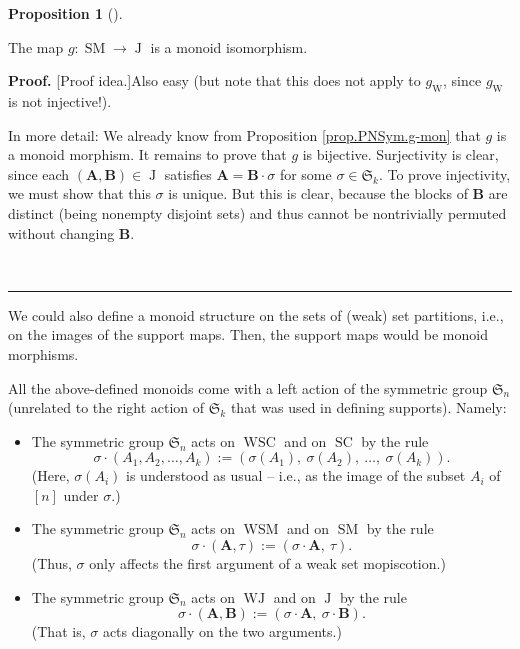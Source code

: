 \documentclass[numbers=enddot,12pt,final,onecolumn,notitlepage]{scrartcl}%
\theoremstyle{definition}
\newtheorem{prop}[theo]{Proposition}
\newenvironment{proposition}[1][]
{\begin{prop}[#1]\begin{leftbar}}
{\end{leftbar}\end{prop}}
\newenvironment{fineprint}{\begin{small}}{\end{small}}
\newenvironment{proof}[1][Proof]{\noindent\textbf{#1.} }{\ \rule{0.5em}{0.5em}}
\begin{document}
\begin{proposition}
\label{prop.PNSym.g-inj}The map $g:\operatorname*{SM}\rightarrow
\operatorname*{J}$ is a monoid isomorphism.
\end{proposition}

\begin{proof}
[Proof idea.]Also easy (but note that this does not apply to
$g_{\operatorname*{W}}$, since $g_{\operatorname*{W}}$ is not injective!).

\begin{fineprint}
In more detail: We already know from Proposition \ref{prop.PNSym.g-mon} that
$g$ is a monoid morphism. It remains to prove that $g$ is bijective.
Surjectivity is clear, since each $\left(  \mathbf{A},\mathbf{B}\right)
\in\operatorname*{J}$ satisfies $\mathbf{A}=\mathbf{B}\cdot\sigma$ for some
$\sigma\in\mathfrak{S}_{k}$. To prove injectivity, we must show that this
$\sigma$ is unique. But this is clear, because the blocks of $\mathbf{B}$ are
distinct (being nonempty disjoint sets) and thus cannot be nontrivially
permuted without changing $\mathbf{B}$.
\end{fineprint}
\end{proof}

We could also define a monoid structure on the sets of (weak) set partitions,
i.e., on the images of the support maps. Then, the support maps would be
monoid morphisms.

All the above-defined monoids come with a left action of the symmetric group
$\mathfrak{S}_{n}$ (unrelated to the right action of $\mathfrak{S}_{k}$ that
was used in defining supports). Namely:

\begin{itemize}
\item The symmetric group $\mathfrak{S}_{n}$ acts on $\operatorname*{WSC}$ and
on $\operatorname*{SC}$ by the rule%
\[
\sigma\cdot\left(  A_{1},A_{2},\ldots,A_{k}\right)  :=\left(  \sigma\left(
A_{1}\right)  ,\ \sigma\left(  A_{2}\right)  ,\ \ldots,\ \sigma\left(
A_{k}\right)  \right)  .
\]
(Here, $\sigma\left(  A_{i}\right)  $ is understood as usual -- i.e., as the
image of the subset $A_{i}$ of $\left[  n\right]  $ under $\sigma$.)

\item The symmetric group $\mathfrak{S}_{n}$ acts on $\operatorname*{WSM}$ and
on $\operatorname*{SM}$ by the rule%
\[
\sigma\cdot\left(  \mathbf{A},\tau\right)  :=\left(  \sigma\cdot
\mathbf{A},\ \tau\right)  .
\]
(Thus, $\sigma$ only affects the first argument of a weak set mopiscotion.)

\item The symmetric group $\mathfrak{S}_{n}$ acts on $\operatorname*{WJ}$ and
on $\operatorname*{J}$ by the rule%
\[
\sigma\cdot\left(  \mathbf{A},\mathbf{B}\right)  :=\left(  \sigma
\cdot\mathbf{A},\ \sigma\cdot\mathbf{B}\right)  .
\]
(That is, $\sigma$ acts diagonally on the two arguments.)
\end{itemize}
\end{document}
